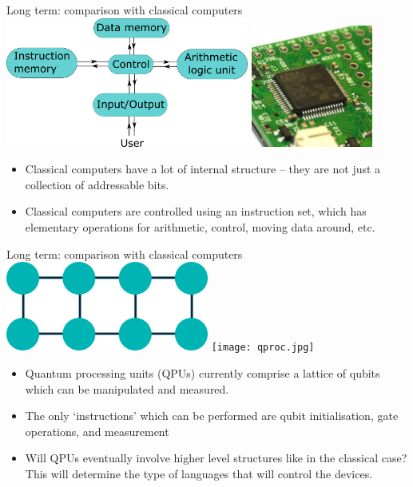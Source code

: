 \documentclass{beamer}
\begin{document}
\begin{frame}{Long term: comparison with classical computers}
  \includegraphics[width=0.6\textwidth]{Harvard_architecture.png}
  \hfill
  \includegraphics[width=0.3\textwidth]{micro.jpg}
  \begin{itemize}
  \item Classical computers have a lot of internal structure -- they are not just a collection of addressable bits.
  \item Classical computers are controlled using an instruction set, which has elementary operations for arithmetic, control, moving data around, etc.
  \end{itemize}
\end{frame}

\begin{frame}{Long term: comparison with classical computers}
  \includegraphics[width=0.5\textwidth]{nearestneighbourcon.png}
  \hfill
  \texttt{[image: qproc.jpg]}
  \begin{itemize}
  \item Quantum processing units (QPUs) currently comprise a lattice of qubits which can be manipulated and measured.
  \item The only `instructions' which can be performed are qubit initialisation, gate operations, and measurement
  \item Will QPUs eventually involve higher level structures like in the classical case? This will determine the type of languages that will control the devices.
  \end{itemize}
\end{frame}
\end{document}
